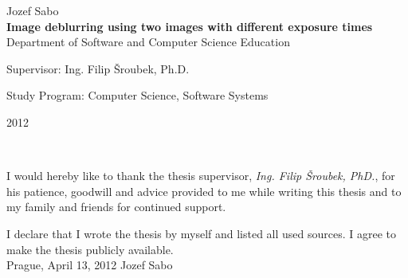 \documentclass[12pt,notitlepage]{report}
\begin{document}
\begin{titlepage}
\begin{center}
\vspace{15mm}

{\Large Jozef Sabo}\\ %
\vspace{5mm}
{\Large\bf Image deblurring using two images with different exposure times}\\
\vspace{5mm}
Department of Software and Computer Science Education\\ %
\end{center}
\vspace{17mm}

\begin{center}
\large
\noindent Supervisor: Ing. Filip Šroubek, Ph.D.
\vspace{1mm}

\noindent Study Program: Computer Science, Software Systems
\end{center}

\vspace{8mm}


\begin{center}
2012 %
\end{center}

\end{titlepage} %
\pagestyle{plain}
\normalsize %
\setcounter{page}{2} %
\ \vspace{10mm}

\noindent I would hereby like to thank the thesis supervisor, {\em Ing. Filip Šroubek, PhD.}, for his patience, goodwill and advice provided to me while writing this thesis and to my family and friends for continued support.

\vspace{\fill} %
\noindent I declare that I wrote the thesis by myself and listed all used sources. I agree to make the thesis publicly available. \\[2cm]

\noindent Prague, April 13, 2012 \hspace{\fill}Jozef Sabo\\ %

\end{document}
